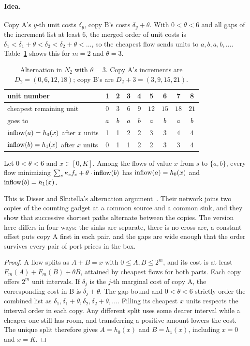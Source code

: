 \paragraph{Idea.} Copy A's $y$-th unit costs $\delta_y$, copy B's costs $\delta_y+\theta$. With
$0<\theta<6$ and all gaps of the increment list at least $6$, the merged order of unit costs is
$\delta_1<\delta_1+\theta<\delta_2<\delta_2+\theta<\dots$, so the cheapest flow sends units to
$a,b,a,b,\dots$. Table~\ref{tab:alt} shows this for $m=2$ and $\theta=3$.

\begin{table}[h]
\centering
\small
\begin{tabular}{@{}lcccccccc@{}}
\toprule
unit number & 1 & 2 & 3 & 4 & 5 & 6 & 7 & 8\\
\midrule
cheapest remaining unit & $0$ & $3$ & $6$ & $9$ & $12$ & $15$ & $18$ & $21$\\
goes to & $a$ & $b$ & $a$ & $b$ & $a$ & $b$ & $a$ & $b$\\
$\mathrm{inflow}(a)=h_0(x)$ after $x$ units & 1 & 1 & 2 & 2 & 3 & 3 & 4 & 4\\
$\mathrm{inflow}(b)=h_1(x)$ after $x$ units & 0 & 1 & 1 & 2 & 2 & 3 & 3 & 4\\
\bottomrule
\end{tabular}
\caption{Alternation in $N_2$ with $\theta=3$. Copy A's increments are $D_2=(0,6,12,18)$; copy B's
are $D_2+3=(3,9,15,21)$.}
\label{tab:alt}
\end{table}

\begin{lemma}[Alternation]\label{lem:alt}
\statusrefereed
Let $0<\theta<6$ and $x\in[0,K]$. Among the flows of value $x$ from $s$ to $\{a,b\}$, every flow
minimizing $\sum_e\kappa_ef_e+\theta\cdot\mathrm{inflow}(b)$ has $\mathrm{inflow}(a)=h_0(x)$ and $\mathrm{inflow}(b)=h_1(x)$.
\end{lemma}

This is Disser and Skutella's alternation argument~\cite[\S3.2, proof of Lemma 2]{ds15}. Their network
joins two copies of the counting gadget at a common source and a common sink, and they show that
successive shortest paths alternate between the copies. The version here differs in four ways: the sinks
are separate, there is no cross arc, a constant offset puts copy A first in each pair, and the gaps are
wide enough that the order survives every pair of port prices in the box.

\begin{proof}
A flow splits as $A+B=x$ with $0\le A,B\le2^m$, and its cost is at least
$F_m(A)+F_m(B)+\theta B$, attained by cheapest flows for both parts.
Each copy offers $2^m$ unit intervals. If $\delta_j$ is the $j$-th
marginal cost of copy A, the corresponding cost in B is $\delta_j+\theta$.
The gap bound and $0<\theta<6$ strictly order the combined list as
$\delta_1,\delta_1+\theta,\delta_2,\delta_2+\theta,\ldots$.
Filling its cheapest $x$ units respects the interval order in each
copy. Any different split uses some dearer interval while a cheaper
one still has room, and transferring a positive amount lowers the cost.
The unique split therefore gives $A=h_0(x)$ and $B=h_1(x)$, including
$x=0$ and $x=K$.
\end{proof}

